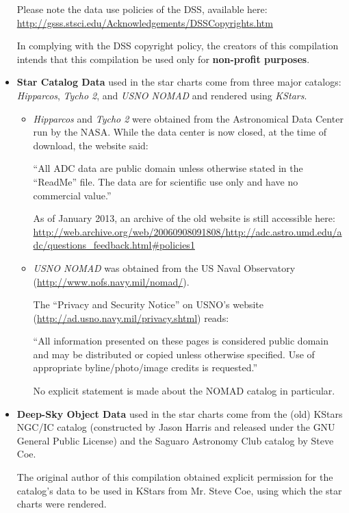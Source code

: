 \begin{itemize}
  Please note the data use policies of the DSS, available here:
  \url{http://gsss.stsci.edu/Acknowledgements/DSSCopyrights.htm}
  
  In complying with the DSS copyright policy, the creators of this
  compilation intends that this compilation be used only for
  \textbf{non-profit purposes}.

\item \textbf{Star Catalog Data} used in the star charts come from
  three major catalogs: \emph{Hipparcos}, \emph{Tycho 2}, and
  \emph{USNO NOMAD} and rendered using \emph{KStars}.

  \begin{itemize}
    \item \emph{Hipparcos} and \emph{Tycho 2} were obtained from the
      Astronomical Data Center run by the NASA. While the data center
      is now closed, at the time of download, the website said:

      ``All ADC data are public domain unless otherwise stated in the
      ``ReadMe'' file. The data are for scientific use only and have
      no commercial value.''

      As of January 2013, an archive of the old website is still
      accessible here:
      \url{http://web.archive.org/web/20060908091808/http://adc.astro.umd.edu/adc/questions_feedback.html#policies1}

    \item \emph{USNO NOMAD} was obtained from the US Naval Observatory
      (\url{http://www.nofs.navy.mil/nomad/}).

      The ``Privacy and Security Notice'' on USNO's website
      (\url{http://ad.usno.navy.mil/privacy.shtml}) reads:

      ``All information presented on these pages is considered public
      domain and may be distributed or copied unless otherwise
      specified. Use of appropriate byline/photo/image credits is
      requested.''

      No explicit statement is made about the NOMAD catalog in
      particular.
  \end{itemize}

\item \textbf{Deep-Sky Object Data} used in the star charts come from
  the (old) KStars NGC/IC catalog (constructed by Jason Harris and
  released under the GNU General Public License) and the Saguaro
  Astronomy Club catalog by Steve Coe.

  The original author of this compilation obtained explicit permission
  for the catalog's data to be used in KStars from Mr. Steve Coe,
  using which the star charts were rendered.


\end{itemize}
